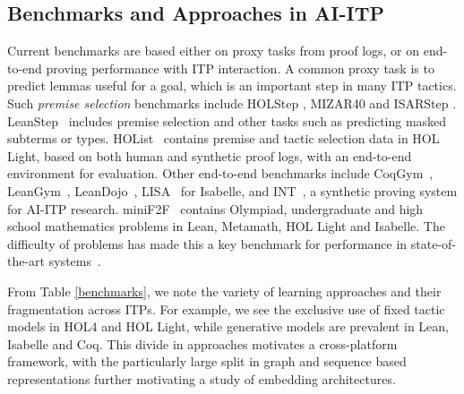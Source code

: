 \documentclass[letterpaper]{article} %
\newcommand\system[1]{#1}
\newcommand\dataset[1]{#1}
\begin{document}
    \subsection{Benchmarks and Approaches in AI-ITP}
    Current benchmarks are based either on proxy tasks from proof logs, or on end-to-end proving performance with ITP interaction.
    A common proxy task is to predict lemmas useful for a goal, which is an important step in many ITP tactics.
    Such \textit{premise selection} benchmarks include \dataset{HOLStep} \cite{kaliszyk_holstep_2017}, \dataset{MIZAR40} \cite{kaliszyk_mizar_2015} and ISARStep \cite{li_isarstep_2020}.
    \dataset{LeanStep}~\cite{han_proof_2021} %
    includes premise selection and other tasks such as predicting masked subterms or types.
    \dataset{HOList}~\cite{bansal_holist_2019} contains premise and tactic selection data in \system{HOL Light}, based on both human and synthetic proof logs, with an end-to-end environment for evaluation.
    Other end-to-end benchmarks include \dataset{CoqGym}~\cite{yang_learning_2019}, %
    \dataset{LeanGym}~\cite{polu_formal_2022},
    \dataset{LeanDojo}~\cite{yang_leandojo_2023}, %
    \dataset{LISA}~\cite{jiang_lisa_2021} for \system{Isabelle}, and \system{INT}~\cite{wu_int_2020}, a synthetic proving system for AI-ITP research.
    \dataset{miniF2F}~\cite{zheng_minif2f_2021} contains Olympiad, undergraduate and high school mathematics problems in \system{Lean}, \system{Metamath}, \system{HOL Light} and \system{Isabelle}. The difficulty of problems has made this a key benchmark for performance in state-of-the-art systems~\cite{lample_hypertree_2022, yang_leandojo_2023, polu_formal_2022}.

    From Table \ref{benchmarks}, we note the variety of learning approaches and their fragmentation across ITPs. For example, we see the exclusive use of fixed tactic models in \system{HOL4} and \system{HOL Light}, while generative models are prevalent in \system{Lean}, Isabelle and Coq.
    This divide in approaches motivates a cross-platform framework, with the particularly large split in graph and sequence based representations further motivating a study of embedding architectures.
\end{document}
